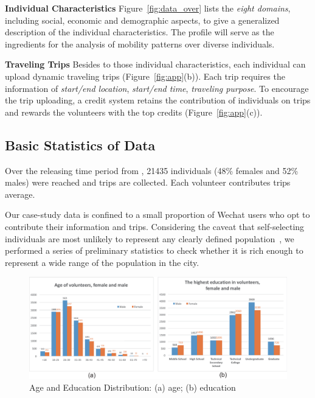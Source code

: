 \textbf{Individual Characteristics} Figure~\ref{fig:data_over} lists the \textit{eight domains}, including social, economic and demographic aspects, to give a generalized description of the individual characteristics. The profile will serve as the ingredients for the analysis of mobility patterns over diverse individuals.

\textbf{Traveling Trips} Besides to those individual characteristics, each individual can upload dynamic traveling trips (Figure~\ref{fig:app}(b)). Each trip requires the information of \textit{start/end location}, \textit{start/end time}, \textit{traveling purpose}. To encourage the trip uploading, a credit system retains the contribution of individuals on trips and rewards the volunteers with the top credits (Figure~\ref{fig:app}(c)).


\subsection{Basic Statistics of Data}

Over the releasing time period from , 21435 individuals (48\% females and 52\% males) were reached and  trips are collected. Each volunteer contributes  trips average.

Our case-study data is confined to a small proportion of Wechat users who opt to contribute their information and trips.
Considering the caveat that self-selecting individuals are most unlikely to represent any clearly defined population~\citep{Longley2015}, we performed a series of preliminary statistics to check whether it is rich enough to represent a wide range of the population in the city.


\begin{figure}[htb!]
 \centering %
 \includegraphics[width=\columnwidth]{pictures/data1}
 \caption{Age and Education Distribution: (a) age; (b) education}
 \label{fig:data_age_edu}
\end{figure}

